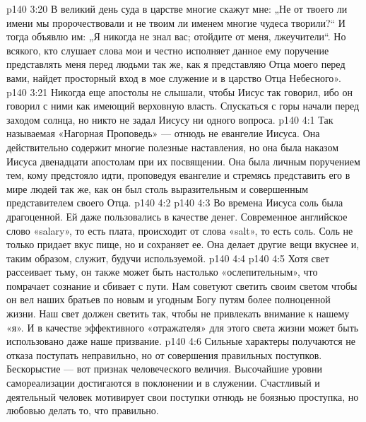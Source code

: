 \vs p140 3:20 В великий день суда в царстве многие скажут мне: „Не от твоего ли имени мы пророчествовали и не твоим ли именем многие чудеса творили?“ И тогда объявлю им: „Я никогда не знал вас; отойдите от меня, лжеучители“. Но всякого, кто слушает слова мои и честно исполняет данное ему поручение представлять меня перед людьми так же, как я представляю Отца моего перед вами, найдет просторный вход в мое служение и в царство Отца Небесного».
\vs p140 3:21 \pc Никогда еще апостолы не слышали, чтобы Иисус так говорил, ибо он говорил с ними как имеющий верховную власть. Спускаться с горы начали перед заходом солнца, но никто не задал Иисусу ни одного вопроса.
\vs p140 4:1 Так называемая «Нагорная Проповедь» --- отнюдь не евангелие Иисуса. Она действительно содержит многие полезные наставления, но она была наказом Иисуса двенадцати апостолам при их посвящении. Она была личным поручением тем, кому предстояло идти, проповедуя евангелие и стремясь представить его в мире людей так же, как он был столь выразительным и совершенным представителем своего Отца.
\vs p140 4:2 \pc {}
\vs p140 4:3 Во времена Иисуса соль была драгоценной. Ей даже пользовались в качестве денег. Современное английское слово «salary», то есть плата, происходит от слова «salt», то есть соль. Соль не только придает вкус пище, но и сохраняет ее. Она делает другие вещи вкуснее и, таким образом, служит, будучи используемой.
\vs p140 4:4 \pc {}
\vs p140 4:5 Хотя свет рассеивает тьму, он также может быть настолько «ослепительным», что помрачает сознание и сбивает с пути. Нам советуют светить своим светом  чтобы он вел наших братьев по новым и угодным Богу путям более полноценной жизни. Наш свет должен светить так, чтобы не привлекать внимание к нашему «я». И в качестве эффективного «отражателя» для этого света жизни может быть использовано даже наше призвание.
\vs p140 4:6 Сильные характеры получаются не  отказа поступать неправильно, но от совершения правильных поступков. Бескорыстие --- вот признак человеческого величия. Высочайшие уровни самореализации достигаются в поклонении и в служении. Счастливый и деятельный человек мотивирует свои поступки отнюдь не боязнью проступка, но любовью делать то, что правильно.

